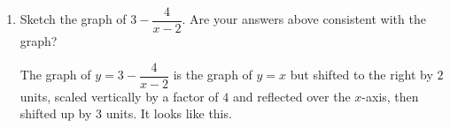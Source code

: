 \documentclass{article}
\begin{document}
\begin{enumerate}
\begin{enumerate}
  \item
    \begin{problem}[\vfill]
      Sketch the graph of $3 - \dfrac{4}{x - 2}$.  Are your answers above
      consistent with the graph? 
    \end{problem}

    \begin{solution}
      The graph of $y = 3 - \dfrac{4}{x - 2}$ is the graph of $y=x$ but shifted to the right by $2$ units,
      scaled vertically by a factor of $4$ and reflected over the $x$-axis, then shifted up by $3$ units.
      It looks like this.

    \end{solution}

  \end{enumerate}

\end{enumerate}
\end{document}
